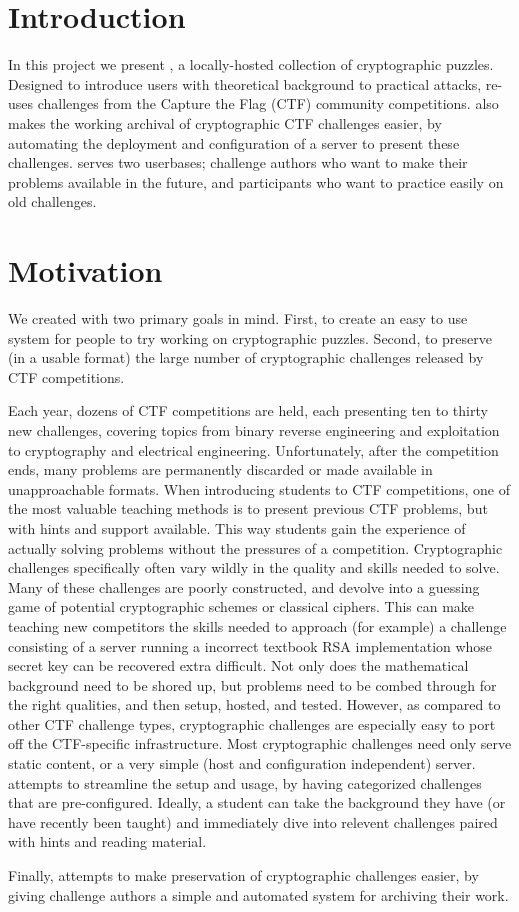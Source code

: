 \section{Introduction}
In this project we present \cvm{}, a locally-hosted collection of
cryptographic puzzles. Designed to introduce users with theoretical
background to practical attacks, \cvm{} re-uses challenges from the
Capture the Flag (CTF) community competitions. \cvm{} also makes the
working archival of cryptographic CTF challenges easier, by automating
the deployment and configuration of a server to present these
challenges. \cvm{} serves two userbases; challenge authors who want to
make their problems available in the future, and participants who want
to practice easily on old challenges.


\section{Motivation}
We created \cvm{} with two primary goals in mind. First, to create an
easy to use system for people to try working on cryptographic
puzzles. Second, to preserve (in a usable format) the large number of
cryptographic challenges released by CTF competitions.

Each year, dozens of CTF competitions are held, each presenting ten to
thirty new challenges, covering topics from binary reverse engineering
and exploitation to cryptography and electrical
engineering. Unfortunately, after the competition ends, many problems
are permanently discarded or made available in unapproachable
formats. When introducing students to CTF competitions, one of the
most valuable teaching methods is to present previous CTF problems,
but with hints and support available. This way students gain the
experience of actually solving problems without the pressures of a
competition. Cryptographic challenges specifically often vary wildly
in the quality and skills needed to solve. Many of these challenges
are poorly constructed, and devolve into a guessing game of potential
cryptographic schemes or classical ciphers. This can make teaching new
competitors the skills needed to approach (for example) a challenge
consisting of a server running a incorrect textbook RSA implementation
whose secret key can be recovered extra difficult. Not only does the
mathematical background need to be shored up, but problems need to be
combed through for the right qualities, and then setup, hosted, and
tested. However, as compared to other CTF challenge types,
cryptographic challenges are especially easy to port off the
CTF-specific infrastructure. Most cryptographic challenges need only
serve static content, or a very simple (host and configuration
independent) server. \cvm{} attempts to streamline the setup and
usage, by having categorized challenges that are
pre-configured. Ideally, a student can take the background they have
(or have recently been taught) and immediately dive into relevent
challenges paired with hints and reading material.

Finally, \cvm{} attempts to make preservation of cryptographic
challenges easier, by giving challenge authors a simple and automated
system for archiving their work.
